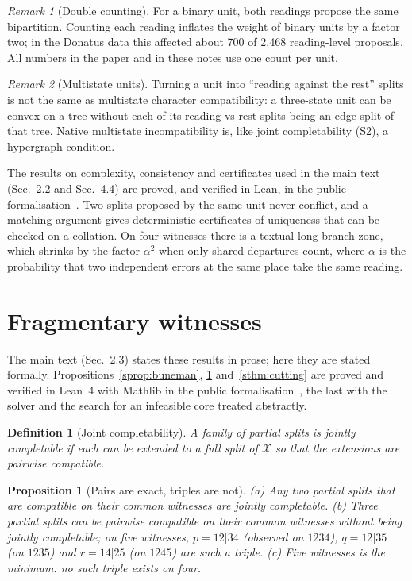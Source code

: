 \documentclass[11pt,a4paper]{article}
\newtheorem{definition}{Definition}
\newtheorem{proposition}[theorem]{Proposition}
\theoremstyle{remark}
\newtheorem{remark}{Remark}
\newcommand{\X}{\mathcal{X}}
\begin{document}
\begin{remark}[Double counting]\label{rem:double}
For a binary unit, both readings propose the same bipartition. Counting each reading inflates the weight of binary units by a factor two; in the Donatus data this affected about 700 of 2{,}468 reading-level proposals. All numbers in the paper and in these notes use one count per unit.
\end{remark}

\begin{remark}[Multistate units]
Turning a unit into ``reading against the rest'' splits is not the same as multistate character compatibility: a three-state unit can be convex on a tree without each of its reading-vs-rest splits being an edge split of that tree. Native multistate incompatibility is, like joint completability (S2), a hypergraph condition.
\end{remark}

The results on complexity, consistency and certificates used in the main text (Sec.~2.2 and Sec.~4.4) are proved, and verified in Lean, in the public formalisation~\citep{StemmaLean}. Two splits proposed by the same unit never conflict, and a matching argument gives deterministic certificates of uniqueness that can be checked on a collation. On four witnesses there is a textual long-branch zone, which shrinks by the factor $\alpha^2$ when only shared departures count, where $\alpha$ is the probability that two independent errors at the same place take the same reading.

\section{Fragmentary witnesses}
\label{app:partial}
The main text (Sec.~2.3) states these results in prose; here they are stated formally. Propositions~\ref{sprop:buneman}, \ref{sprop:triple} and~\ref{sthm:cutting} are proved and verified in Lean~4 with Mathlib in the public formalisation~\citep{StemmaLean}, the last with the solver and the search for an infeasible core treated abstractly.

\begin{definition}[Joint completability]
A family of partial splits is \emph{jointly completable} if each can be extended to a full split of $\X$ so that the extensions are pairwise compatible.
\end{definition}

\begin{proposition}[Pairs are exact, triples are not]\label{sprop:triple}
(a) Any two partial splits that are compatible on their common witnesses are jointly completable.
(b) Three partial splits can be pairwise compatible on their common witnesses without being jointly completable; on five witnesses, $p=12|34$ (observed on $1234$), $q=12|35$ (on $1235$) and $r=14|25$ (on $1245$) are such a triple.
(c) Five witnesses is the minimum: no such triple exists on four.
\end{proposition}
\end{document}
